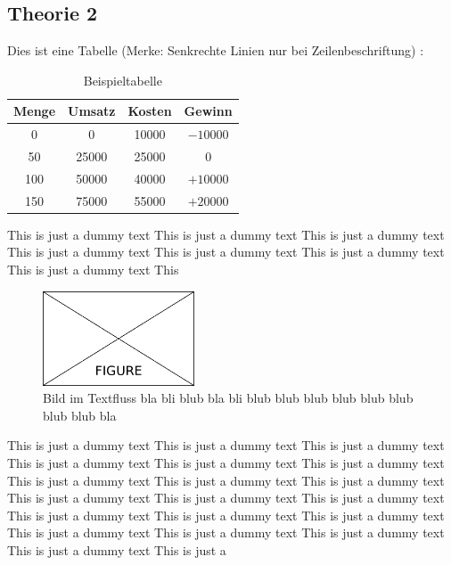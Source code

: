 \subsection{Theorie 2}
\label{sec:theorieB}

Dies ist eine Tabelle (Merke: Senkrechte Linien nur bei Zeilenbeschriftung)  :

\medskip
\begin{table}[!h]
	\centering
	{\renewcommand{\arraystretch}{1.5}
		\begin{tabular}{cccc}
			\toprule 
			Menge & Umsatz & Kosten & Gewinn \\ \midrule 
			0 & 0 & 10000 & $-10000$ \\ %
			50 & 25000 & 25000 & 0 \\ %
			100 & 50000 & 40000 & $+10000$ \\ %
			150 & 75000 & 55000 & $+20000$ \\
			\bottomrule 
		\end{tabular}
	}
	\caption{Beispieltabelle}
	\label{tab:BSP}
\end{table}

This is just a dummy text This is just a dummy text This is just a dummy text This is just a dummy text This is just a dummy text This is just a dummy text
This is just a dummy text This

\begin{figure}
	\centering
	\includegraphics[width=0.4\textwidth]{Content/Figures/figure.png}
	\caption{Bild im Textfluss bla bli blub bla bli blub blub blub blub blub blub blub blub bla}
	\label{fig:test}
\end{figure}

This is just a dummy text This is just a dummy text This is just a dummy text This is just a dummy text This is just a dummy text This is just a dummy text This is just a dummy text This is just a dummy text This is just a dummy text This is just a dummy text This is just a dummy text This is just a dummy text This is just a dummy text This is just a dummy text This is just a dummy text This is just a dummy text This is just a dummy text This is just a dummy text This is just a dummy text This is just a

